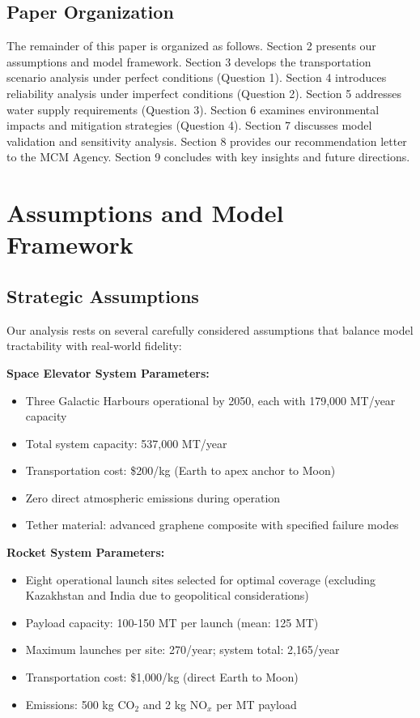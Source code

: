 \documentclass[12pt]{article}
\begin{document}
	\subsection{Paper Organization}
	
	The remainder of this paper is organized as follows. Section 2 presents our assumptions and model framework. Section 3 develops the transportation scenario analysis under perfect conditions (Question 1). Section 4 introduces reliability analysis under imperfect conditions (Question 2). Section 5 addresses water supply requirements (Question 3). Section 6 examines environmental impacts and mitigation strategies (Question 4). Section 7 discusses model validation and sensitivity analysis. Section 8 provides our recommendation letter to the MCM Agency. Section 9 concludes with key insights and future directions.
	
	\section{Assumptions and Model Framework}
	
	\subsection{Strategic Assumptions}
	
	Our analysis rests on several carefully considered assumptions that balance model tractability with real-world fidelity:
	
	\textbf{Space Elevator System Parameters:}
	\begin{itemize}[leftmargin=2em, itemsep=1pt]
		\item Three Galactic Harbours operational by 2050, each with 179,000 MT/year capacity
		\item Total system capacity: 537,000 MT/year
		\item Transportation cost: \$200/kg (Earth to apex anchor to Moon)
		\item Zero direct atmospheric emissions during operation
		\item Tether material: advanced graphene composite with specified failure modes
	\end{itemize}
	
	\textbf{Rocket System Parameters:}
	\begin{itemize}[leftmargin=2em, itemsep=1pt]
		\item Eight operational launch sites selected for optimal coverage (excluding Kazakhstan and India due to geopolitical considerations)
		\item Payload capacity: 100-150 MT per launch (mean: 125 MT)
		\item Maximum launches per site: 270/year; system total: 2,165/year
		\item Transportation cost: \$1,000/kg (direct Earth to Moon)
		\item Emissions: 500 kg CO$_2$ and 2 kg NO$_x$ per MT payload
	\end{itemize}
	
\end{document}
